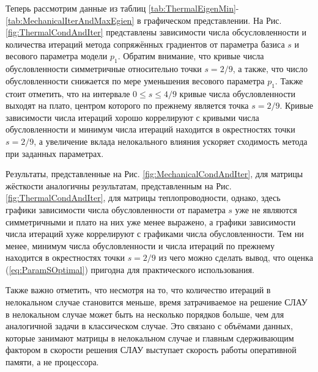 Теперь рассмотрим данные из таблиц \ref{tab:ThermalEigenMin}-\ref{tab:MechanicalIterAndMaxEgien} в графическом представлении. На Рис. \ref{fig:ThermalCondAndIter} представлены зависимости числа обсусловленности и количества итераций метода сопряжённых градиентов от параметра базиса $s$ и весового параметра модели $p_1$. Обратим внимание, что кривые числа обусловленности симметричные относительно точки $s = 2/9$, а также, что число обусловленности снижается по мере уменьшения весового параметра $p_1$. Также стоит отметить, что на интервале $0 \leqslant s \leqslant 4/9$ кривые числа обусловленности выходят на плато, центром которого по прежнему является точка $s = 2/9$. Кривые зависимости числа итераций хорошо коррелируют с кривыми числа обусловленности и минимум числа итераций находится в окрестностях точки $s = 2/9$, а увеличение вклада нелокального влияния ускоряет сходимость метода при заданных параметрах.



Результаты, представленные на Рис. \ref{fig:MechanicalCondAndIter}, для матрицы жёсткости аналогичны результатам, представленным на Рис. \ref{fig:ThermalCondAndIter}, для матрицы теплопроводности, однако, здесь графики зависимости числа обусловленности от параметра $s$ уже не являются симметричными и плато на них уже менее выражено, а графики зависимости числа итераций хуже коррелируют с графиками числа обусловленности. Тем ни менее, минимум числа обусловленности и числа итераций по прежнему находится в окрестностях точки $s = 2/9$ из чего можно сделать вывод, что оценка (\ref{eq:ParamSOptimal}) пригодна для практического использования.

Также важно отметить, что несмотря на то, что количество итераций в нелокальном случае становится меньше, время затрачиваемое на решение СЛАУ в нелокальном случае может быть на несколько порядков больше, чем для аналогичной задачи в классическом случае. Это связано с объёмами данных, которые занимают матрицы в нелокальном случае и главным сдерживающим фактором в скорости решения СЛАУ выступает скорость работы оперативной памяти, а не процессора.

